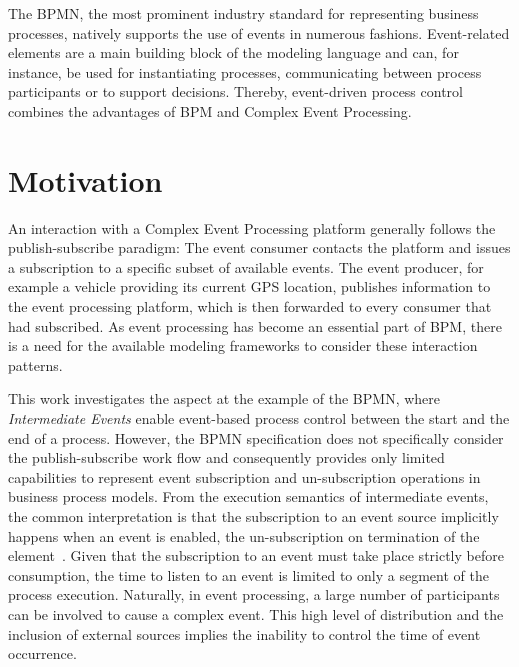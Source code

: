 The \ac{BPMN}, the most prominent industry standard for representing business processes, %
natively supports the use of events in numerous fashions. Event-related elements are a main building block of the modeling language and can, for instance, be used for instantiating processes, communicating between process participants or to support decisions.
Thereby, event-driven process control combines the advantages of \acl{BPM} and Complex Event Processing.


\section{Motivation}

An interaction with a Complex Event Processing platform generally follows the publish-subscribe paradigm: The event consumer contacts the platform and issues a subscription to a specific subset of available events.
The event producer, for example a vehicle providing its current GPS location, publishes information to the event processing platform, which is then forwarded to every consumer that had subscribed.
As event processing has become an essential part of \ac{BPM}, there is a need for the available modeling frameworks to consider these interaction patterns.

This work investigates the aspect at the example of the \ac{BPMN}, where \textit{Intermediate Events} enable event-based process control between the start and the end of a process. %
However, the BPMN specification does not specifically consider the publish-subscribe work flow and consequently provides only limited capabilities to represent event subscription and un-subscription operations in business process models.
From the execution semantics of intermediate events, the common interpretation is that the subscription to an event source implicitly happens when an event is enabled, the un-subscription on termination of the element~\cite{Pufahl2007, mandal:2017}.
Given that the subscription to an event must take place strictly before consumption, the time to listen to an event is limited to only a segment of the process execution.
Naturally, in event processing, a large number of participants can be involved to cause a complex event. This high level of distribution and the inclusion of external sources implies the inability to control the time of event occurrence.%

